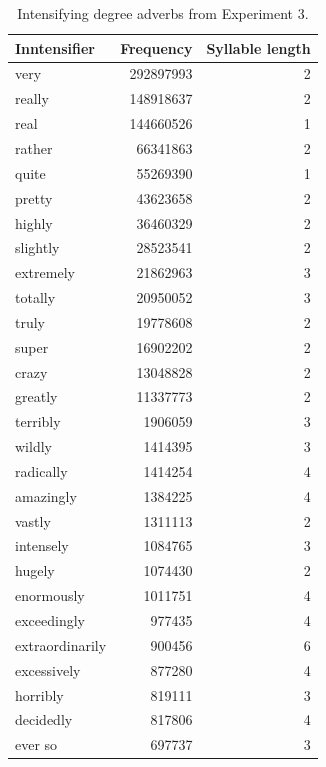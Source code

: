 \documentclass[10pt,letterpaper]{article}
\begin{document}
      \begin{table}[!ht]
      \begin{center} 
      \caption{Intensifying degree adverbs from Experiment 3.} 
      \label{intensifiers-exp3-table} 
      \vskip 0.12in
      \begin{tabular}{lrr} 
      \hline
      Inntensifier &  Frequency & Syllable length \\
      \hline 
      very        & 292897993 & 2 \\
      really      & 148918637 & 2 \\ 
      real        & 144660526 & 1 \\ 
      rather      &  66341863 & 2 \\ 
      quite       &  55269390 & 1 \\ 
      pretty      &  43623658 & 2 \\ 
      highly      &  36460329 & 2 \\ 
      slightly    &  28523541 & 2 \\ 
      extremely   &  21862963 & 3 \\ 
      totally     &  20950052 & 3 \\ 
      truly       &  19778608 & 2 \\ 
      super       &  16902202 & 2 \\ 
      crazy       &  13048828 & 2 \\ 
      greatly     &  11337773 & 2 \\ 
      terribly    &   1906059 & 3 \\ 
      wildly      &   1414395 & 3 \\ 
      radically   &   1414254 & 4 \\ 
      amazingly   &   1384225 & 4 \\ 
      vastly      &   1311113 & 2 \\ 
      intensely   &   1084765 & 3 \\ 
      hugely      &   1074430 & 2 \\ 
      enormously  &   1011751 & 4 \\ 
      exceedingly &    977435 & 4 \\ 
      extraordinarily & 900456 & 6 \\ 
      excessively & 877280 & 4 \\ 
      horribly & 819111 & 3 \\ 
      decidedly & 817806 & 4 \\ 
      ever so & 697737 & 3 \\ 

\end{tabular}
\end{center}
\end{table}
\end{document}
